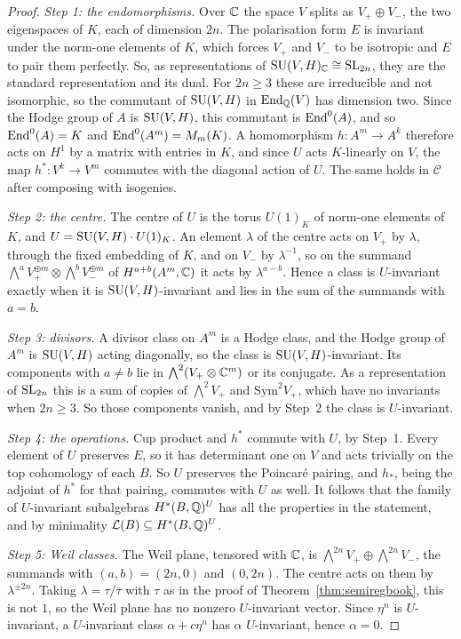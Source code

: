 \begin{proof}
\emph{Step 1: the endomorphisms.} Over $\mathbb{C}$ the space $V$ splits as
$V_{+}\oplus V_{-}$, the two eigenspaces of $K$, each of
dimension $2n$. The polarisation form $E$ is invariant under the norm-one
elements of $K$, which forces $V_{+}$ and $V_{-}$ to be
isotropic and $E$ to pair them perfectly. So, as representations of
$\operatorname{SU}(V,H)_{\mathbb{C}}\cong\operatorname{SL}_{2n}$, they are the standard representation and its
dual. For $2n\ge3$ these are irreducible and not isomorphic, so the
commutant of $\operatorname{SU}(V,H)$ in $\operatorname{End}_{\mathbb{Q}}(V)$ has dimension two. Since the
Hodge group of $A$ is $\operatorname{SU}(V,H)$, this commutant is $\operatorname{End}^{0}(A)$, and so
$\operatorname{End}^{0}(A)=K$ and $\operatorname{End}^{0}(A^{m})=M_{m}(K)$. A homomorphism
$h\colon A^{m}\to A^{k}$ therefore acts on $H^{1}$ by a matrix with entries
in $K$, and since $U$ acts $K$-linearly on $V$, the map
$h^{*}\colon V^{k}\to V^{m}$ commutes with the diagonal action of $U$. The
same holds in $\mathcal C$ after composing with isogenies.

\emph{Step 2: the centre.} The centre of $U$ is the torus $U(1)_{K}$ of
norm-one elements of $K$, and $U=\operatorname{SU}(V,H)\cdot U(1)_{K}$. An element
$\lambda$ of the centre acts on $V_{+}$ by $\lambda$, through the fixed embedding of $K$, and on
$V_{-}$ by $\lambda^{-1}$, so on the summand
$\bigwedge^{a}V_{+}^{\oplus m}\otimes\bigwedge^{b}V_{-}^{\oplus m}$
of $H^{a+b}(A^{m},\mathbb{C})$ it acts by $\lambda^{a-b}$. Hence a class is
$U$-invariant exactly when it is $\operatorname{SU}(V,H)$-invariant and lies in the sum of
the summands with $a=b$.

\emph{Step 3: divisors.} A divisor class on $A^{m}$ is a Hodge class, and
the Hodge group of $A^{m}$ is $\operatorname{SU}(V,H)$ acting diagonally, so the class is
$\operatorname{SU}(V,H)$-invariant. Its components with $a\ne b$ lie in
$\bigwedge^{2}(V_{+}\otimes\mathbb{C}^{m})$ or its conjugate. As a
representation of $\operatorname{SL}_{2n}$ this is a sum of copies of
$\bigwedge^{2}V_{+}$ and $\mathrm{Sym}^{2}V_{+}$, which have no
invariants when $2n\ge3$. So those components vanish, and by Step~2 the
class is $U$-invariant.

\emph{Step 4: the operations.} Cup product and $h^{*}$ commute with $U$, by
Step~1. Every element of $U$ preserves $E$, so it has determinant one on $V$
and acts trivially on the top cohomology of each $B$. So $U$ preserves the
Poincar\'e pairing, and $h_{*}$, being the adjoint of $h^{*}$ for that
pairing, commutes with $U$ as well. It follows that the family of
$U$-invariant subalgebras $H^{*}(B,\mathbb{Q})^{U}$ has all the properties in the
statement, and by minimality $\mathcal L(B)\subseteq H^{*}(B,\mathbb{Q})^{U}$.

\emph{Step 5: Weil classes.} The Weil plane, tensored with $\mathbb{C}$, is
$\bigwedge^{2n}V_{+}\oplus\bigwedge^{2n}V_{-}$, the summands
with $(a,b)=(2n,0)$ and $(0,2n)$. The centre acts on them by
$\lambda^{\pm2n}$. Taking $\lambda=\tau/\bar\tau$ with $\tau$ as in
the proof of Theorem~\ref{thm:semiregbook}, this is not $1$, so the Weil plane
has no nonzero $U$-invariant vector. Since $\eta^{n}$ is $U$-invariant, a
$U$-invariant class $\alpha+c\eta^{n}$ has $\alpha$ $U$-invariant, hence
$\alpha=0$.
\end{proof}

